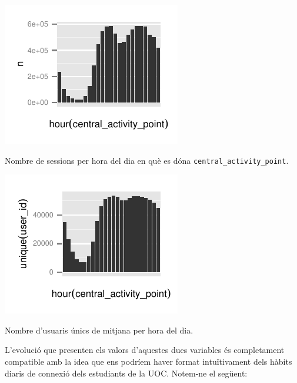 \documentclass[
	a4paper,
	twoside,
	justified
]{tufte-book}
\begin{document}
\begin{marginfigure}
\begin{center}
\includegraphics{c_a_point_h_bar}
\caption{
	\label{graph:c_a_point_h_bar}
	Nombre de sessions per hora del dia en què es dóna \texttt{central\_activity\_point}. 
}
\end{center}
\end{marginfigure}

\begin{marginfigure}
\begin{center}
\includegraphics{users_by_hour_bar}
\caption{
	\label{graph:users_by_hour_bar}
	Nombre d'usuaris únics de mitjana per hora del dia. 
}
\end{center}
\end{marginfigure} 

L'evolució que presenten els valors d'aquestes dues variables és completament compatible amb la idea que ens podríem haver format intuïtivament dels hàbits diaris de connexió dels estudiants de la UOC. Notem-ne el següent:
\end{document}
